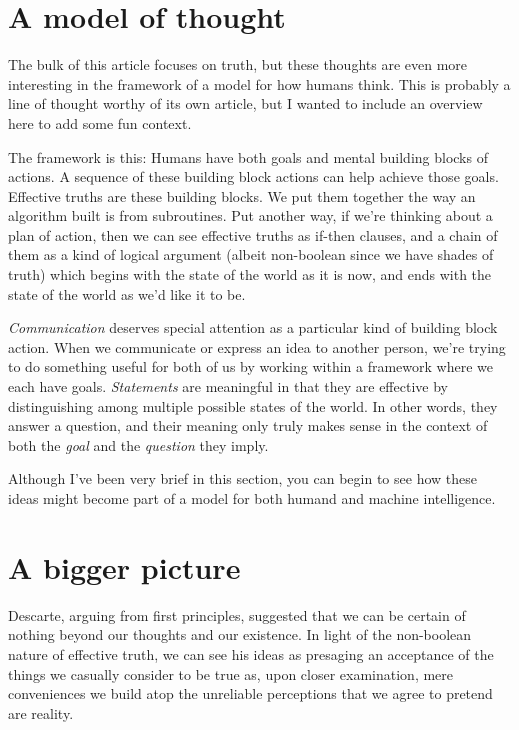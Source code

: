 \documentclass[20pt,]{extarticle}
\begin{document}
\section{A model of thought}\label{a-model-of-thought}

The bulk of this article focuses on truth, but these thoughts are even
more interesting in the framework of a model for how humans think. This
is probably a line of thought worthy of its own article, but I wanted to
include an overview here to add some fun context.

The framework is this: Humans have both goals and mental building blocks
of actions. A sequence of these building block actions can help achieve
those goals. Effective truths are these building blocks. We put them
together the way an algorithm built is from subroutines. Put another
way, if we're thinking about a plan of action, then we can see effective
truths as if-then clauses, and a chain of them as a kind of logical
argument (albeit non-boolean since we have shades of truth) which begins
with the state of the world as it is now, and ends with the state of the
world as we'd like it to be.

\emph{Communication} deserves special attention as a particular kind of
building block action. When we communicate or express an idea to another
person, we're trying to do something useful for both of us by working
within a framework where we each have goals. \emph{Statements} are
meaningful in that they are effective by distinguishing among multiple
possible states of the world. In other words, they answer a question,
and their meaning only truly makes sense in the context of both the
\emph{goal} and the \emph{question} they imply.

Although I've been very brief in this section, you can begin to see how
these ideas might become part of a model for both humand and machine
intelligence.

\section{A bigger picture}\label{a-bigger-picture}

Descarte, arguing from first principles, suggested that we can be
certain of nothing beyond our thoughts and our existence. In light of
the non-boolean nature of effective truth, we can see his ideas as
presaging an acceptance of the things we casually consider to be true
as, upon closer examination, mere conveniences we build atop the
unreliable perceptions that we agree to pretend are reality.
\end{document}
